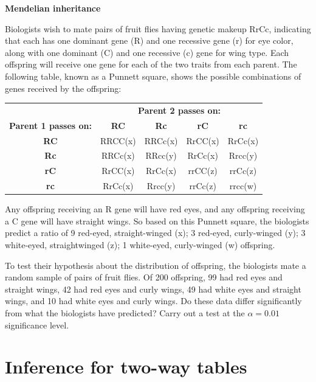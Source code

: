 \documentclass[a4paper, 12pt,twoside]{book}
\begin{document}
\colorbox{champagne}{\parbox{\textwidth}{
\textbf{Mendelian inheritance }\vspace{0.3cm}

Biologists wish to mate pairs of fruit flies having genetic makeup RrCc, indicating that each has one dominant gene (R) and one recessive gene (r) for eye color, along with one dominant (C) and one recessive (c) gene for wing type. Each offspring will receive one gene for each of the two traits from each parent. The following table, known as a Punnett square, shows the possible combinations of genes received by the offspring:
    \begin{table}[H]
    \centering
       \begin{tabular}{ccccc}
       \hline
       &\multicolumn{4}{c}{\textbf{Parent 2 passes on:}}\\
       \textbf{Parent 1 passes on:}&\textbf{RC} &\textbf{Rc} &\textbf{rC} &\textbf{rc}\\
       \textbf{RC} &RRCC(x)&RRCc(x)&RrCC(x)&RrCc(x)\\
       \textbf{Rc}& RRCc(x)&RRcc(y)&RrCc(x)&Rrcc(y)\\
       \textbf{rC}&RrCC(x)&RrCc(x)&rrCC(z)&rrCc(z)\\
       \textbf{rc}&RrCc(x)&Rrcc(y)&rrCc(z)&rrcc(w)\\
       \hline
       \end{tabular}
    \end{table}
    
    Any offspring receiving an R gene will have red eyes, and any offspring receiving a C gene will have straight wings. So based on this Punnett square, the biologists predict a ratio of 9 red-eyed, straight-winged (x); 3 red-eyed, curly-winged (y); 3 white-eyed, straightwinged (z); 1 white-eyed, curly-winged (w) offspring.\vspace{0.3cm}
    
    To test their hypothesis about the distribution of offspring, the biologists mate a random sample of pairs of fruit flies. Of 200 offspring, 99 had red eyes and straight wings, 42 had red eyes and curly wings, 49 had white eyes and straight wings, and 10 had white eyes and curly wings. Do these data differ significantly from what the biologists have predicted? Carry out a test at the $\alpha = 0.01$ significance level.
}}
\newpage

\section{Inference for two-way tables}
\end{document}
